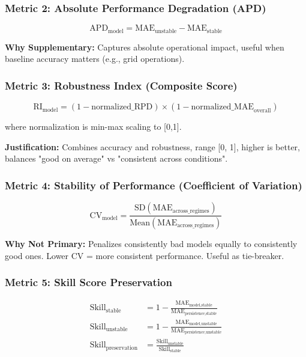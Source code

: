 \documentclass[11pt,a4paper]{article}
\begin{document}
\subsubsection{Metric 2: Absolute Performance Degradation (APD)}

\begin{equation}
\text{APD}_{\text{model}} = \text{MAE}_{\text{unstable}} - \text{MAE}_{\text{stable}}
\end{equation}

\textbf{Why Supplementary:} Captures absolute operational impact, useful when baseline accuracy matters (e.g., grid operations).

\subsubsection{Metric 3: Robustness Index (Composite Score)}

\begin{equation}
\text{RI}_{\text{model}} = (1 - \text{normalized\_RPD}) \times (1 - \text{normalized\_MAE}_{\text{overall}})
\end{equation}

where normalization is min-max scaling to [0,1].

\textbf{Justification:} Combines accuracy and robustness, range [0, 1], higher is better, balances "good on average" vs "consistent across conditions".

\subsubsection{Metric 4: Stability of Performance (Coefficient of Variation)}

\begin{equation}
\text{CV}_{\text{model}} = \frac{\text{SD}(\text{MAE}_{\text{across\_regimes}})}{\text{Mean}(\text{MAE}_{\text{across\_regimes}})}
\end{equation}

\textbf{Why Not Primary:} Penalizes consistently bad models equally to consistently good ones. Lower CV = more consistent performance. Useful as tie-breaker.

\subsubsection{Metric 5: Skill Score Preservation}

\begin{align}
\text{Skill}_{\text{stable}} &= 1 - \frac{\text{MAE}_{\text{model,stable}}}{\text{MAE}_{\text{persistence,stable}}} \\
\text{Skill}_{\text{unstable}} &= 1 - \frac{\text{MAE}_{\text{model,unstable}}}{\text{MAE}_{\text{persistence,unstable}}} \\
\text{Skill}_{\text{preservation}} &= \frac{\text{Skill}_{\text{unstable}}}{\text{Skill}_{\text{stable}}}
\end{align}
\end{document}
